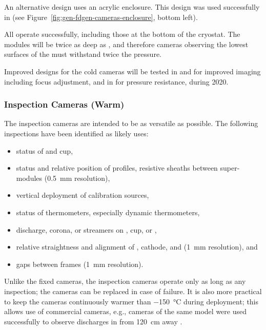 An alternative design uses an acrylic enclosure.
This design was used successfully in  (see Figure~\ref{fig:gen-fdgen-cameras-enclosure}, bottom left).

All operate successfully, including those at the bottom of the cryostat.  %
The  modules will be twice as deep as , and therefore cameras observing the lowest surfaces of the  must withstand twice the pressure.

Improved designs for the cold cameras will be tested in  and  for improved imaging including focus adjustment, and in  for pressure resistance, during 2020. 

\subsubsection{Inspection Cameras (Warm)}

The inspection cameras are intended to be as versatile as possible.
The following %
inspections have been identified as likely uses:
\begin{itemize}
\item status of  \fdth and cup,
\item status and relative position of  profiles, resistive sheaths between  super-modules (\SI{0.5}{mm} resolution),
\item vertical deployment of calibration sources,
\item status of thermometers, especially dynamic thermometers,
\item {} discharge, corona, or streamers on  \fdth, cup, or ,
\item relative straightness and alignment of , cathode, and  (\SI{1}{mm} resolution), and
\item gaps between  frames (\SI{1}{mm} resolution).
\end{itemize}

Unlike the fixed cameras, the inspection cameras operate only as
long as any inspection; the cameras can be replaced in case of failure.  It
is also more practical to keep the cameras continuously warmer than
 \SI{-150}{\celsius} during deployment; this allows use of  %
commercial cameras, %
e.g., cameras of the same model were used successfully to observe discharges
in  from \SI{120}{cm} away \cite{Auger:2015xlo}.


